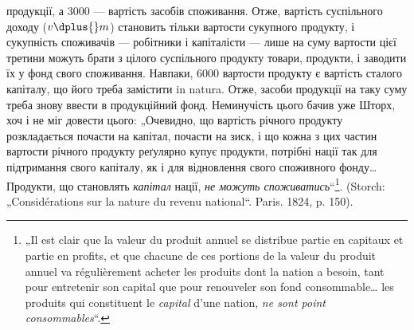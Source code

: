 \parcont{}  %
продукції, а 3000 — вартість засобів споживання. Отже, вартість суспільного
доходу ($v \dplus{} m$) становить тільки  вартости сукупного продукту,
і сукупність споживачів — робітники і капіталісти — лише на суму вартости
цієї третини можуть брати з цілого суспільного продукту товари,
продукти, і заводити їх у фонд свого споживання. Навпаки, 6000 \deq{} 
вартости продукту є вартість сталого капіталу, що його треба замістити
in natura. Отже, засоби продукції на таку суму треба знову ввести в
продукційний фонд. Неминучість цього бачив уже Шторх, хоч і не міг
довести цього: „Очевидно, що вартість річного продукту розкладається
почасти на капітал, почасти на зиск, і що кожна з цих частин вартости річного
продукту реґулярно купує продукти, потрібні нації так для підтримання
свого капіталу, як і для відновлення свого споживного фонду\dots{} Продукти,
що становлять \emph{капітал} нації, \emph{не можуть споживатись}“\footnote*{
„Il est clair que la valeur du produit annuel se distribue partie en capitaux
et partie en profits, et que chacune de ces portions de la valeur du produit annuel
va régulièrement acheter les produits dont la nation a besoin, tant pour entretenir
son capital que pour renouveler son fond consommable\dots{} les produits qui constituent
le \emph{capital} d’une nation, \emph{ne sont point consommables}“.
}. (Storch:
„Considérations sur la nature du revenu national“. Paris. 1824, p. 150).


